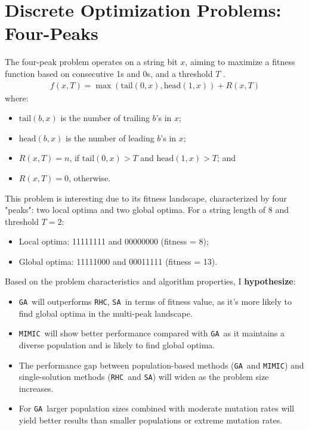 \documentclass[conference]{IEEEtran}
\newcommand{\sa}{\texttt{SA}}
\newcommand{\ga}{\texttt{GA}}
\newcommand{\rhc}{\texttt{RHC}}
\newcommand{\mimic}{\texttt{MIMIC}}
\begin{document}
\section{Discrete Optimization Problems: Four-Peaks \label{sec:four-peaks}}
The four-peak problem operates on a string bit $x$, aiming to maximize a fitness function based on consecutive 1s and 0s, and a threshold $T$ \cite{b2}. 
\begin{align}
    f(x, T) = \max(\text{tail}(0, x), \text{head}(1, x)) + R(x, T)\label{eq: 4-peak-fitness}
\end{align}
where:
\begin{itemize}
    \item $\text{tail}(b, x)$ is the number of trailing $b$'s in $x$;
    \item $\text{head}(b, x)$ is the number of leading $b$'s in $x$;
    \item $R(x, T) = n$, if $\text{tail}(0, x) > T$ and $\text{head}(1, x) > T$; and
    \item $R(x, T) = 0$, otherwise.
\end{itemize}
This problem is interesting due to its fitness landscape, characterized by four "peaks": two local optima and two global optima. For a string length of 8 and threshold $T = 2$:
\begin{itemize}
    \item Local optima: 11111111 and 00000000 (fitness = 8);
    \item Global optima: 11111000 and 00011111 (fitness = 13).
\end{itemize}
Based on the problem characteristics and algorithm properties, I \textbf{hypothesize}:
\begin{itemize}
    \item \ga\ will outperforms \rhc, \sa\ in terms of fitness value, as it's more likely to find global optima in the multi-peak landscape.
    \item \mimic\ will show better performance compared with \ga\, as it maintains a diverse population and is likely to find global optima.
    \item The performance gap between population-based methods (\ga\ and \mimic) and single-solution methods (\rhc\ and \sa) will widen as the problem size increases.
    \item For \ga\, larger population sizes combined with moderate mutation rates will yield better results than smaller populations or extreme mutation rates.
\end{itemize}
\end{document}
